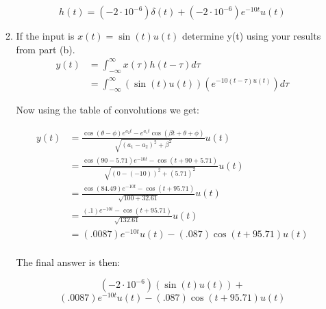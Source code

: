 \documentclass{article}
\begin{document}
\begin{enumerate}
\begin{multicols*}{2}
\begin{enumerate}
\begin{equation}
            \boxed{h(t) = (-2\cdot 10^{-6})\delta(t)+(-2\cdot 10^{-6})e^{-10t}u(t)}
        \end{equation}
        \columnbreak
        \item If the input is $x(t) = \sin(t) u(t)$ determine y(t) using your results from part (b).
        \begin{align}
            y(t) &= \int_{-\infty}^{\infty}x(\tau)h(t-\tau)d\tau\\
            &=  \int_{-\infty}^{\infty}(\sin(t)u(t))(e^{-10(t-\tau)u(t)})d\tau
        \end{align}
        \begin{center}
            Now using the table of convolutions we get:
        \end{center}
        \begin{align}
            y(t) &= \frac{\cos(\theta - \phi)e^{a_2t}-e^{a_1t}\cos(\beta t+\theta+\phi)}{\sqrt{(a_1 - a_2)^2+\beta^2}}u(t)\\
            &= \frac{\cos(90 - 5.71)e^{-10t}-\cos(t+90+ 5.71)}{\sqrt{(0 - (-10))^2+(5.71)^2}}u(t)\\
            &= \frac{\cos(84.49)e^{-10t}-\cos(t+95.71)}{\sqrt{100+32.61}}u(t)\\
            &= \frac{(.1)e^{-10t}-\cos(t+95.71)}{\sqrt{132.61}}u(t)\\
            &= (.0087)e^{-10t}u(t)-(.087)\cos(t+95.71)u(t)\\
        \end{align}
        \begin{center}
            The final answer is then:
        \end{center}
        \begin{equation}
            (-2\cdot10^{-6})(\sin(t)u(t))+
        \end{equation}
        \begin{equation}
            (.0087)e^{-10t}u(t)-(.087)\cos(t+95.71)u(t)
        \end{equation}
    \end{enumerate}
    \end{multicols*}
\end{enumerate}
\newpage
\end{document}
